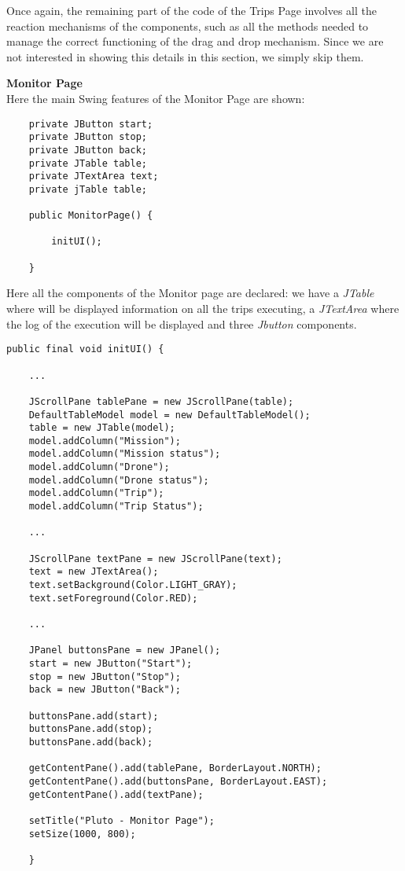 Once again, the remaining part of the code of the Trips Page involves all the reaction mechanisms of the components, such as all the methods needed to manage the correct functioning of the drag and drop mechanism.
Since we are not interested in showing this details in this section, we simply skip them.

\newpage

\textbf{Monitor Page}
\\

Here the main Swing features of the Monitor Page are shown:

\begin{lstlisting}
	private JButton start;
	private JButton stop;
	private JButton back;
	private JTable table;
	private JTextArea text;
    private jTable table;

	public MonitorPage() {

		initUI();
		
	}
\end{lstlisting}

Here all the components of the Monitor page are declared:
we have a \textit{JTable} where will be displayed information on all the trips executing, a \textit{JTextArea} where the log of the execution will be displayed and three \textit{Jbutton} components.


\begin{lstlisting}
public final void initUI() {

	...

	JScrollPane tablePane = new JScrollPane(table);
	DefaultTableModel model = new DefaultTableModel();
    table = new JTable(model);
	model.addColumn("Mission");
    model.addColumn("Mission status");
	model.addColumn("Drone");
	model.addColumn("Drone status");
	model.addColumn("Trip");
	model.addColumn("Trip Status");

	...
    
    JScrollPane textPane = new JScrollPane(text);
	text = new JTextArea();
	text.setBackground(Color.LIGHT_GRAY);
	text.setForeground(Color.RED);

	...

	JPanel buttonsPane = new JPanel();
	start = new JButton("Start");
	stop = new JButton("Stop");
	back = new JButton("Back"); 

	buttonsPane.add(start);
	buttonsPane.add(stop);
	buttonsPane.add(back);

	getContentPane().add(tablePane, BorderLayout.NORTH);
	getContentPane().add(buttonsPane, BorderLayout.EAST);
	getContentPane().add(textPane);

	setTitle("Pluto - Monitor Page");
	setSize(1000, 800);
			
	}
\end{lstlisting}


